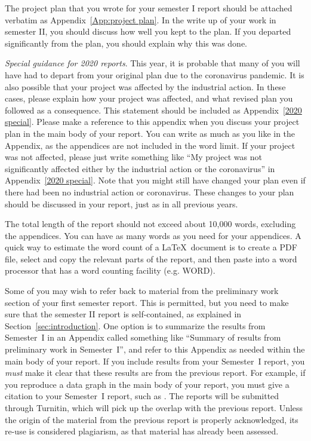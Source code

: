 \documentclass[aps,pra,twocolumn]{revtex4-2}
\begin{document}
The project plan that you wrote for your semester I report should be attached verbatim as Appendix~\ref{App:project plan}. In the write up of your work in semester II, you should discuss how well you kept to the plan. If you departed significantly from the plan, you should explain why this was done.

\textit{Special guidance for 2020 reports}. This year, it is probable that many of you will have had to depart from your original plan due to the coronavirus pandemic. It is also possible that your project was affected by the industrial action. In these cases, please explain how your project was affected, and what revised plan you followed as a consequence. This statement should be included as Appendix~\ref{2020 special}. Please make a reference to this appendix when you discuss your project plan in the main body of your report. You can write as much as you like in the Appendix, as the appendices are not included in the word limit. 
If your project was not affected, please just write something like ``My project was not significantly affected either by the industrial action or the coronavirus'' in Appendix~\ref{2020 special}. Note that you might still have changed your plan even if there had been no industrial action or coronavirus. These changes to your plan should be discussed in your report, just as in all previous years.

 
The total length of the report should not exceed about 10,000 words, excluding the appendices. You can have as many words as you need for your appendices. A quick way to estimate the word count of a \LaTeX\ document is to create a PDF file, select and copy the relevant parts  of the report, and then paste into a word processor that has a word counting facility (e.g. WORD).

Some of you may wish to refer back to material from the preliminary work section of your first semester report. This is permitted, but you need to make sure that the semester II report is self-contained, as explained in Section~\ref{sec:introduction}. One option is to summarize the results from Semester~I in an Appendix called something like ``Summary of results from preliminary work in Semester~I'', and refer to this Appendix as needed within the main body of your report. If you include results from your Semester~I report, you \textit{must} make it clear that these results are from the previous report. For example, if you reproduce a data graph in the main body of your report, you must give a citation to your Semester~I report, such as \cite{semester 1 report}. The reports will be submitted through Turnitin, which will pick up the overlap with the previous report. Unless the origin of the material from the previous report is properly acknowledged, its re-use is considered plagiarism, as that material has already been assessed.
\end{document}
